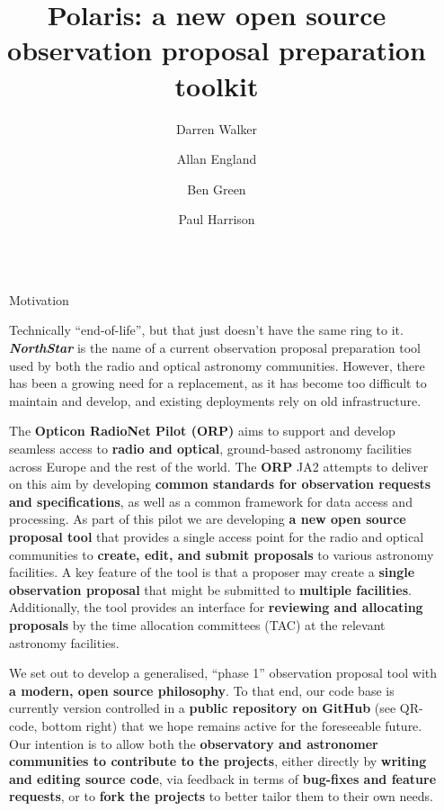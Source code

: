 \documentclass[final]{beamer}
\title{Polaris: a new open source observation proposal preparation toolkit}
\author{Darren Walker \and Allan England \and Ben Green \and Paul Harrison}
\institute[shortinst]{JBCA, The University of Manchester, UK}
\newlength{\sepwidth}
\newlength{\colwidth}
\newcommand{\separatorcolumn}{\begin{column}{\sepwidth}\end{column}}
\begin{document}
    \begin{frame}[t]
        \begin{columns}[t]
            \separatorcolumn

            \begin{column}{\colwidth}

                \begin{block}{Motivation}

                    Technically ``end-of-life'', but that just doesn't have the same ring to it.
                    \textbf{\emph{NorthStar}} is the name of a current observation proposal preparation tool used
                    by both the radio and optical astronomy communities.
                    However, there has been a growing need for a replacement, as
                    it has become too difficult to maintain and develop, and existing deployments rely on old infrastructure.


                    The \textbf{Opticon RadioNet Pilot (ORP)} aims to support and develop seamless access to
                    \textbf{radio and optical}, ground-based astronomy facilities across Europe and the rest of the
                    world.
                    The \textbf{ORP} JA2 attempts to deliver on this aim by developing \textbf{common standards for observation
                    requests and specifications}, as well as a common framework for data access and processing.
                    As part of this pilot we are developing \textbf{a new open source proposal tool} that provides a
                    single access point for the radio and optical communities to
                    \textbf{create, edit, and submit proposals} to various astronomy facilities.
                    A key feature of the tool is that a proposer may create a \textbf{single observation proposal} that
                    might be submitted to \textbf{multiple facilities}.
                    Additionally, the tool provides an interface for \textbf{reviewing and allocating proposals} by the
                    time allocation committees (TAC) at the relevant astronomy facilities.

                    We set out to develop a generalised, ``phase 1'' observation proposal tool with
                    \textbf{a modern, open source philosophy}.
                    To that end, our code base is currently version controlled in a
                    \textbf{public repository on GitHub} (see QR-code, bottom right) that we hope remains active for
                    the foreseeable future.
                    Our intention is to allow both the
                    \textbf{observatory and astronomer communities to contribute to the projects},
                    either directly by \textbf{writing and editing source code}, via feedback in terms of
                    \textbf{bug-fixes and feature requests}, or to \textbf{fork the projects} to better tailor them to
                    their own needs.


\end{block}
\end{column}
\end{columns}
\end{frame}
\end{document}
